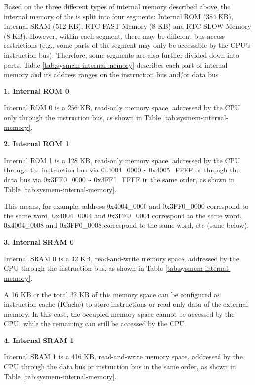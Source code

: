 \documentclass[main\_\_EN.tex]{subfiles}
\begin{document}
Based on the three different types of internal memory described above, the internal memory of the \chipname{} is split into four segments: Internal ROM (384 KB), Internal SRAM (512 KB), RTC FAST Memory (8 KB) and RTC SLOW Memory (8 KB). However, within each segment, there may be different bus access restrictions (e.g., some parts of the segment may only be accessible by the CPU's instruction bus). Therefore, some segments are also further divided down into parts. Table \ref{tab:sysmem-internal-memory} describes each part of internal memory and its address ranges on the instruction bus and/or data bus.




{\bfseries 1. Internal ROM 0}

Internal ROM 0 is a 256 KB, read-only memory space, addressed by the CPU only through the instruction bus, as shown in Table \ref{tab:sysmem-internal-memory}.

{\bfseries 2. Internal ROM 1}
\label{other:sysmem-internal-ROM-1}

Internal ROM 1 is a 128 KB, read-only memory space, addressed by the CPU through the instruction bus via 0x{}4004\_0000 \verb+~+ 0x{}4005\_FFFF or through the data bus via 0x{}3FF0\_0000 \verb+~+ 0x{}3FF1\_FFFF in the same order, as shown in Table \ref{tab:sysmem-internal-memory}.

This means, for example, address 0x{}4004\_0000 and 0x{}3FF0\_0000 correspond to the same word, 0x{}4004\_0004 and 0x{}3FF0\_0004 correspond to the same word, 0x{}4004\_0008 and 0x{}3FF0\_0008 correspond to the same word, etc (same below).

{\bfseries 3. Internal SRAM 0}
\label{other:sysmem-internal-SRAM-0}

Internal SRAM 0 is a 32 KB, read-and-write memory space, addressed by the CPU through the instruction bus, as shown in Table \ref{tab:sysmem-internal-memory}.

A 16 KB or the total 32 KB of this memory space can be configured as instruction cache (ICache) to store instructions or read-only data of the external memory. In this case, the occupied memory space cannot be accessed by the CPU, while the remaining can still be accessed by the CPU.

{\bfseries 4. Internal SRAM 1}

Internal SRAM 1 is a 416 KB, read-and-write memory space, addressed by the CPU through the data bus or instruction bus in the same order, as shown in Table \ref{tab:sysmem-internal-memory}.
\end{document}
